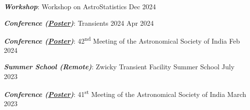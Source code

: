 \textbf{\textit{Workshop}}: Workshop on AstroStatistics \hfill Dec 2024


\textbf{\textit{Conference (\href{https://www.dropbox.com/scl/fi/aw33s2tmk6wsrwwbju25e/ASI-2024-poster.pdf?rlkey=aiasm86d2e3t40235q0knu635&st=3qr65pz8&dl=0}{Poster})}}: Transients 2024 \hfill Apr 2024

\textbf{\textit{Conference (\href{https://www.dropbox.com/scl/fi/aw33s2tmk6wsrwwbju25e/ASI-2024-poster.pdf?rlkey=aiasm86d2e3t40235q0knu635&st=3qr65pz8&dl=0}{Poster})}}: 42\textsuperscript{nd} Meeting of the Astronomical Society of India \hfill Feb 2024

\textbf{\textit{Summer School (Remote)}}: Zwicky Transient Facility Summer School \hfill July 2023

\textbf{\textit{Conference (\href{https://www.dropbox.com/scl/fi/2vxerkx3lhnbb6bgwactw/ASI-2023-Poster.pdf?rlkey=1hyjudte4bn1xf4sks47nb0c5&st=lc2jnnm0&dl=0}{Poster})}}: 41\textsuperscript{st} Meeting of the Astronomical Society of India \hfill March 2023


